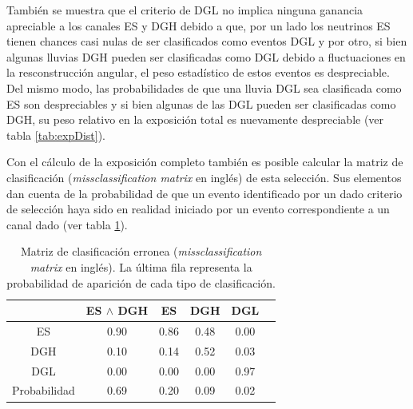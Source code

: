 	También se muestra que el criterio de DGL no implica ninguna ganancia apreciable a los canales ES y DGH debido a que, por un lado los neutrinos ES tienen chances casi nulas de ser clasificados como eventos DGL y por otro, si bien algunas lluvias DGH pueden ser clasificadas como DGL debido a fluctuaciones en la resconstrucción angular, el peso estadístico de estos eventos es despreciable.
	Del mismo modo, las probabilidades de que una lluvia DGL sea clasificada como ES son despreciables y si bien algunas de las DGL pueden ser clasificadas como DGH, su peso relativo en la exposición total es nuevamente despreciable (ver tabla \ref{tab:expDist}).
	
	
	Con el cálculo de la exposición completo también es posible calcular la matriz de clasificación (\emph{missclassification matrix} en inglés) de esta selección.
	Sus elementos dan cuenta de la probabilidad de que un evento identificado por un dado criterio de selección haya sido en realidad iniciado por un evento correspondiente a un canal dado (ver tabla \ref{tab:missclass}).
	\begin{table}[ht!]
		\begin{center}
		\renewcommand{\arraystretch}{1.4}
			\begin{tabular}{|c|c|c|c|c|c|}
			\hline
			\diagbox{Lluvia}{Criterio} & ES $\wedge$ DGH &  ES    &  DGH   &  DGL      \\ \hline
			ES                         & 0.90            &  0.86  &  0.48  &  0.00     \\ \hline
			DGH                        & 0.10            &  0.14  &  0.52  &  0.03     \\ \hline
			DGL                        & 0.00            &  0.00  &  0.00  &  0.97     \\ \hline\hline
			Probabilidad               & 0.69            &  0.20  &  0.09  &  0.02     \\
			\hline
			\end{tabular}
		\end{center}
		
		\caption{\label{tab:missclass}Matriz de clasificación erronea (\emph{missclassification matrix} en inglés). La última fila representa la probabilidad de aparición de cada tipo de clasificación.}
	\end{table}
